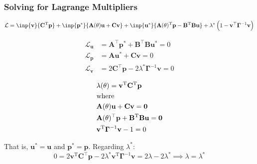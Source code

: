 \documentclass[
  pdf,
  10pt,
  xcolor={svgnames},
]{beamer}
\newcommand{\mbf}[1]{\mathbf{#1}}
\newcommand{\mc}[1]{\mathcal{#1}}
\newcommand{\T}{\mathrm{T}}
\newcommand{\mat}[1]{\mathbf{{#1}}}
\begin{document}
\begin{frame}
  \frametitle{Solving for Lagrange Multipliers}
  \begin{block}{}
    \begin{equation*}
      \mc{L}
      = \inp{\mbf{v}}{\mat{C}^\T \mbf{p}}
      + \inp{\mbf{p}^*}{\mat{A}(\theta)\mbf{u} + \mat{C} \mbf{v}}
      + \inp{\mbf{u}^*}{
        \mat{A}(\theta)^\T \mbf{p} - \mat{B}^\T \mat{B} \mbf{u}
      }
      + \lambda^* \left( 1-\mbf{v}^\top \mat{\Gamma}^{-1} \mbf{v} \right)
    \end{equation*}
  \end{block}
  \begin{minipage}{.5\linewidth}
    \begin{align*}
      \mc{L}_\mbf{u}
       & = \mat{A}^\top \mbf{p}^* + \mat{B}^\top\mat{B} \mbf{u}^* = 0       \\
      \mc{L}_\mbf{p}
       & = \mat{A} \mbf{u}^* + \mat{C} \mbf{v} = 0                          \\
      \mc{L}_\mbf{v}
       & = 2\mat{C}^\top \mbf{p} - 2\lambda^* \mat{\Gamma}^{-1} \mbf{v} = 0
    \end{align*}
  \end{minipage}%
  \begin{minipage}{.5\linewidth}
    \begin{align*}
       &
      \lambda(\theta)
      = \mbf{v}^\T \mat{C}^\T \mbf{p}        \\
       & \text{where}\notag                  \\
       &
      \mat{A}(\theta)\mbf{u}
      + \mat{C} \mbf{v} = \mbf{0}            \\
       &
      \mat{A}({\theta})^\top \mbf{p}
      + \mat{B}^\T \mat{B} \mbf{u} = \mbf{0} \\
       &
      \mbf{v}^\T \mat{\Gamma}^{-1}\mbf{v}
      - 1 = 0
    \end{align*}
  \end{minipage}
  That is, $\mbf{u}^* = \mbf{u}$ and $\mbf{p}^* = \mbf{p}$. \pause Regarding
  $\lambda^*$:
  \[
    0 =
    2\mbf{v}^\T \mat{C}^\top \mbf{p}
    - 2\lambda^* \mbf{v}^\T \mat{\Gamma}^{-1} \mbf{v}
    = 2 \lambda - 2 \lambda^*
    \implies \lambda = \lambda^*
  \]
\end{frame}
\end{document}
